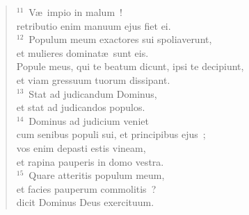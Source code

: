 \begin{flushleft}
\begin{verse}
${}^{11}$~V\ae\ impio in malum~!\\ retributio enim manuum ejus fiet ei.\\
${}^{12}$~Populum meum exactores sui spoliaverunt,\\ et mulieres dominat\ae\ sunt eis.\\ Popule meus, qui te beatum dicunt, ipsi te decipiunt,\\ et viam gressuum tuorum dissipant.\\
${}^{13}$~Stat ad judicandum Dominus,\\ et stat ad judicandos populos.\\
${}^{14}$~Dominus ad judicium veniet\\ cum senibus populi sui, et principibus ejus~;\\ vos enim depasti estis vineam,\\ et rapina pauperis in domo vestra.\\
${}^{15}$~Quare atteritis populum meum,\\ et facies pauperum commolitis~?\\ dicit Dominus Deus exercituum.\end{verse}\end{flushleft}


